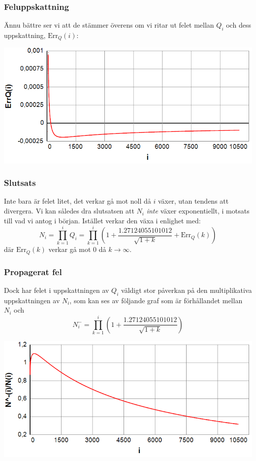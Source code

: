 \documentclass{beamer}
\begin{document}
\begin{frame}
	\frametitle{Feluppskattning}
Ännu bättre ser vi att de stämmer överens om vi ritar ut felet mellan $Q_i$ och dess uppskattning, $\text{Err}_Q(i)$:

\begin{center}
	\includegraphics[scale=0.5]{Export/Complexity18.png}
\end{center}
\end{frame}

\begin{frame}
	\frametitle{Slutsats}
Inte bara är felet litet, det verkar gå mot noll då $i$ växer, utan tendens att divergera. Vi kan således dra slutsatsen att $N_i$ \emph{inte} växer exponentiellt, i motsats till vad vi antog i början. Istället verkar den växa i enlighet med:
\[N_i = \prod_{k=1}^{i} Q_i = \prod_{k=1}^{i} \left(1+\frac{1.27124055101012}{\sqrt{1+k}}+\text{Err}_Q(k)\right) \]
där $\text{Err}_Q(k)$ verkar gå mot 0 då $k \rightarrow \infty$.
\end{frame}

\begin{frame}
	\frametitle{Propagerat fel}
Dock har felet i uppskattningen av $Q_i$ väldigt stor påverkan på den multiplikativa uppskattningen av $N_i$, som kan ses av följande graf som är förhållandet mellan $N_i$ och
\[N^-_i=\prod_{k=1}^{i} \left(1+\frac{1.27124055101012}{\sqrt{1+k}}\right)\]

\begin{center}
	\includegraphics[scale=0.5]{Export/Complexity19.png}
\end{center}
\end{frame}
\end{document}
